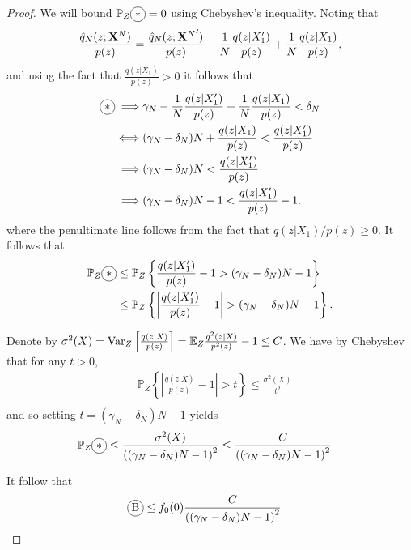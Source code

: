 \begin{proof}
We will bound $\mathbb{P}_Z\encircle{$*$} = 0$ using Chebyshev's inequality.
Noting that 
\begin{align*}
    \frac{\hat{q}_N(z;\mathbf{X}^N)}{p(z)} 
    &= \frac{\hat{q}_N(z;{\mathbf{X}^N}')}{p(z)} - \frac{1}{N}\frac{q(z|X'_1)}{p(z)} + \frac{1}{N}\frac{q(z|X_1)}{p(z)}, \\
\end{align*}
and using the fact that $\frac{q(z|X_1)}{p(z)} > 0$ it follows that
\begin{align*}
    \encircle{$*$} \implies &\gamma_N - \frac{1}{N}\frac{q(z|X'_1)}{p(z)} + \frac{1}{N}\frac{q(z|X_1)}{p(z)} < \delta_N \\
    \iff & (\gamma_N - \delta_N)N + \frac{q(z|X_1)}{p(z)} < \frac{q(z|X'_1)}{p(z)}\\
    \implies & (\gamma_N-\delta_N)N < \frac{q(z|X'_1)}{p(z)}  \\
\implies & (\gamma_N-\delta_N)N - 1 < \frac{q(z|X'_1)}{p(z)} - 1.
\end{align*}
where the penultimate line follows from the fact that $q(z|X_1)/p(z)\geq0$. It follows that
\begin{align*}
    \mathbb{P}_Z\encircle{$*$} &\leq \mathbb{P}_Z\left\lbrace \frac{q(z|X'_1)}{p(z)} - 1 > (\gamma_N-\delta_N)N - 1 \right\rbrace \\
    &\leq \mathbb{P}_Z\left\lbrace \left|\frac{q(z|X'_1)}{p(z)} - 1\right| > (\gamma_N-\delta_N)N - 1 \right\rbrace. \\
\end{align*}

Denote by $\sigma^2(X) = \text{Var}_Z\left[\frac{q(z|X)}{p(z)}\right] = \mathbb{E}_Z \frac{q^2(z|X)}{p^2(z)} - 1 \leq C$.
We have by Chebyshev that for any $t>0$,
\begin{align*}
    &\mathbb{P}_Z\left\lbrace \left|\frac{q(z|X)}{p(z)} - 1\right| > t \right\rbrace \leq \frac{\sigma^2(X)}{t^2} \\
\end{align*}
and so setting $t=(\gamma_N-\delta_N)N - 1$ yields
\begin{align*}
    \mathbb{P}_Z\encircle{$*$} &\leq \frac{\sigma^2(X)}{\left((\gamma_N-\delta_N)N - 1\right)^2} \leq \frac{C}{\left((\gamma_N-\delta_N)N - 1\right)^2}
\end{align*}

It follow that
\begin{align*}
    \encircle{B} &\leq f_0(0) \frac{C}{\left((\gamma_N-\delta_N)N - 1\right)^2}
\end{align*}



\end{proof}
